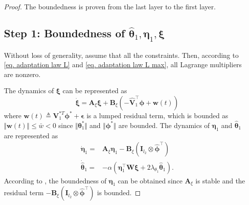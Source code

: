 \documentclass[letterpaper, 10 pt, conference]{ieeeconf}  %
\newcommand*{\mv}[1]{\boldsymbol{#1}}
\newcommand*{\mm}[1]{\boldsymbol{#1}}
\begin{document}
\begin{proof}

The boundedness is proven from the last layer to the first layer.

\subsection*{Step 1: Boundedness of ${\hat{\mv\theta}}_1,{\mm \eta}_1,\mv \xi$}

\color{black}
Without loss of generality, assume that all the constraints. Then, according to \eqref{eq. adaptation law L} and \eqref{eq. adaptation law L max}, all Lagrange multipliers are nonzero.
\color{black}

The dynamics of $\mv \xi$ can be represented as
\begin{equation}    
    \dot {\mv\xi} = \mm A_\xi\mv \xi +\mm B_\xi
    (
        -\hat {\mm V}_1^\top \hat{\mv\phi}+\mv w(t)
    )
\end{equation}
where $\mv w(t)\triangleq {\mm V}_1^{*T}\mv\phi^*+\mv \epsilon$ is a lumped residual term, which is bounded as $\Vert\mv  w(t)\Vert\le \bar w< 0$ since $\Vert\mv\theta_1^*\Vert$ and $\Vert\mv\phi^*\Vert$ are bounded.
The dynamics of ${\mm \eta}_1$ and ${\hat{\mv\theta}}_1$ are represented as
\begin{equation}
    \begin{aligned}
        \dot{\mm \eta}_1 =
        & 
        \mm A_\xi {\mm \eta}_1 -\mm B_\xi (\mm I_{l_{2}}\otimes \hat{\mv\phi}^\top )
        \\
        \dot{{\hat{\mv\theta}}}_1 =
        & -\alpha 
        (
            {\mm \eta}_1^\top \mm W\mv\xi+2\lambda_{\theta_1} {\hat{\mv\theta}}_1
        ).
    \end{aligned} 
\end{equation}
According to \cite[Chap.~4 T.~1.9]{RN32}, the boundedness of ${\mm \eta}_1$ can be obtained since $\mm A_\xi$ is stable and the residual term $-\mm B_\xi (\mm I_{l_{2}}\otimes \hat{\mv\phi}^\top )$ is bounded.


\end{proof}
\end{document}
